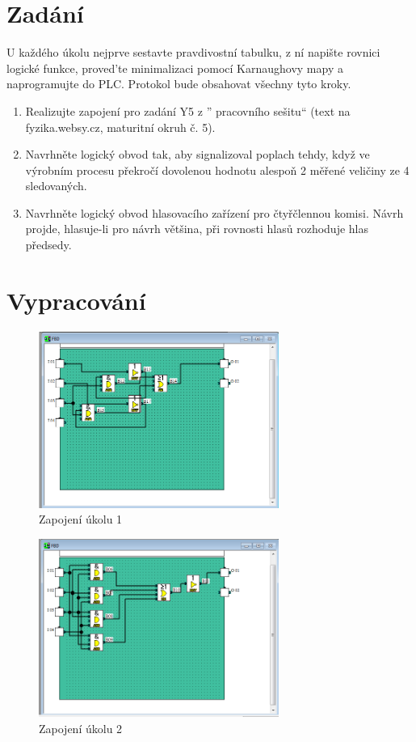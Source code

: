 \documentclass[a4paper]{article}
\begin{document}




\section*{Zadání}
U každého úkolu nejprve sestavte pravdivostní tabulku, z ní napište rovnici
logické funkce, proved’te minimalizaci pomocí Karnaughovy mapy a naprogramujte do PLC. Protokol bude obsahovat všechny tyto kroky.
\begin{enumerate}
	\item Realizujte zapojení pro zadání Y5 z ”
	pracovního sešitu“ (text na
	fyzika.websy.cz, maturitní okruh č. 5).
	\item  Navrhněte logický obvod tak, aby signalizoval poplach tehdy, když
	ve výrobním procesu překročí dovolenou hodnotu alespoň 2 měřené
	veličiny ze 4 sledovaných.
	\item Navrhněte logický obvod hlasovacího zařízení pro čtyřčlennou komisi.
	Návrh projde, hlasuje-li pro návrh většina, při rovnosti hlasů rozhoduje
	hlas předsedy.
\end{enumerate}

\section*{Vypracování}
\begin{figure}[H]
	\centering
	\includegraphics[width=0.7\textwidth]{PLC_1.png}
	\caption{Zapojení úkolu 1}
	\label{fig:mesh1}
\end{figure}

\begin{figure}[H]
	\centering
	\includegraphics[width=0.7\textwidth]{PLC_2.png}
	\caption{Zapojení úkolu 2}
	\label{fig:mesh2}
\end{figure}
\end{document}

